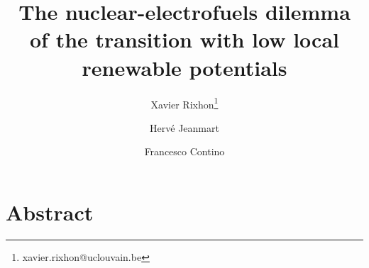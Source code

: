\documentclass[11pt,twoside,a4paper,english]{article}
\begin{document}
\begin{titlepage}


\title{The nuclear-electrofuels dilemma of the transition with low local renewable potentials}

\author[1]{Xavier Rixhon\thanks{xavier.rixhon@uclouvain.be}}
\author[1]{Hervé Jeanmart}
\author[1]{Francesco Contino}







\date{} %
{\let\newpage\relax\maketitle}

\tableofcontents
\printglossaries

\end{titlepage}



\section*{Abstract}

\end{document}
